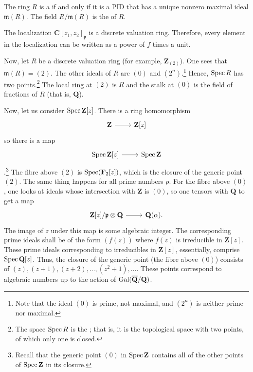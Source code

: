 \documentclass [11 pt, oneside] {article}
\begin{document}
\begin{definition}[ ]\label{}
The ring $R$ is a  if and only if it is a PID that has a unique nonzero maximal ideal $\mathfrak{m}(R)$. The field $R/\mathfrak{m}(R)$ is the  of $R$. 
\end{definition}

\begin{remark}
The localization $\mathbf{C}[z_1,z_2]_{\mathfrak{p}}$ is a discrete valuation ring. Therefore, every element in the localization can be written as a power of $f$ times a unit.	
\end{remark}

Now, let $R$ be a discrete valuation ring (for example, $\mathbf{Z}_{(2)}$). One sees that $\mathfrak{m}(R) =  (2) $. The other ideals of $R$ are $(0)$ and $(2^n)$.\footnote{Note that the ideal $(0)$ is prime, not maximal, and $(2^n)$ is neither prime nor maximal.} Hence, $\operatorname{Spec} R$ has two points.\footnote{The space $\operatorname{Spec} R$ is the ; that is, it is the topological space with two points, of which only one is closed.} The local ring at $(2)$ is $R$ and the stalk at $(0)$ is the field of fractions of $R$ (that is, $\mathbf{Q}$).

Now, let us consider $\operatorname{Spec} \mathbf{Z}[z] $. There is a ring homomorphism
\[
\begin{tikzcd}
\mathbf{Z}\ar[r]& \mathbf{Z}[z]
\end{tikzcd}
\]
so there is a map 
\[
\begin{tikzcd}
\Spec \mathbf{Z}[z] \ar[r]& \Spec \mathbf{Z}
\end{tikzcd}
\]
.\footnote{Recall that the generic point $(0)$ in $\operatorname{Spec} \mathbf{Z}$ contains all of the other points of $\operatorname{Spec}\mathbf{Z}$ in its closure.} The fibre above $(2)$ is $\operatorname{Spec}(\mathbf{F}_{2}[z])$, which is the closure of the generic point $(2)$. The same thing happens for all prime numbers $p$. For the fibre above $(0)$, one looks at ideals whose intersection with $\mathbf{Z}$ is $(0)$, so one tensors with $\mathbf{Q}$ to get a map
\[
\begin{tikzcd}
\mathbf{Z}[z]/\mathfrak{p}\tensor \mathbf{Q}\ar[r]& \mathbf{Q}(\alpha).
\end{tikzcd}
\]
The image of $z$ under this map is some algebraic integer. The corresponding prime ideals shall be of the form $(f(z))$ where $f(z) $ is irreducible in $\mathbf{Z}[z]$. These prime ideals corresponding to irreducibles in $\mathbf{Z}[z]$, essentially, comprise $\operatorname{Spec} \mathbf{Q}[z]$. Thus, the closure of the generic point (the fibre above $(0)$) consists of $(z),  (z+1), (z+2),\hdots,  (z^2+1),\hdots$. These points correspond to algebraic numbers up to the action of $\operatorname{Gal} (\overline{\mathbf{Q}}/\mathbf{Q})$.
\end{document}
